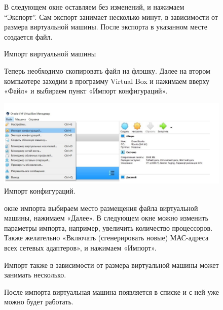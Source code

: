 \documentclass[oneside,final,12pt]{extarticle} %
\begin{document}
\begin{figure}
\quad В следующем окне оставляем без изменений, и нажимаем “Экспорт”. Сам экспорт занимает несколько минут, в зависимости от размера виртуальной машины. После экспорта в указанном месте создается файл.
\end{figure}

\begin{figure}
\centering
Импорт виртуальной машины
\label{ris:image}
\end{figure}

\begin{figure}
\quad Теперь необходимо скопировать файл на флэшку. Далее на втором компьютере заходим в программу Virtual Box и нажимаем вверху «Файл» и выбираем пункт «Импорт конфигураций».

\centering
		\includegraphics[width=0.65\linewidth]{img/14.png}
\caption{Импорт конфигураций.}
\label{ris:image}
\end{figure}

\begin{figure}
 окне импорта выбираем место размещения файла виртуальной машины, нажимаем «Далее». В следующем окне можно изменить параметры импорта, например, увеличить количество процессоров. Также желательно «Включать (сгенерировать новые) МАС-адреса всех сетевых адаптеров», и нажимаем «Импорт».
\end{figure}

\begin{figure}
\quad Импорт также в зависимости от размера виртуальной машины может занимать несколько.
\end{figure}

\begin{figure}
\quad После импорта виртуальная машина появляется в списке и с ней уже можно будет работать.
\end{figure}
\end{document}
